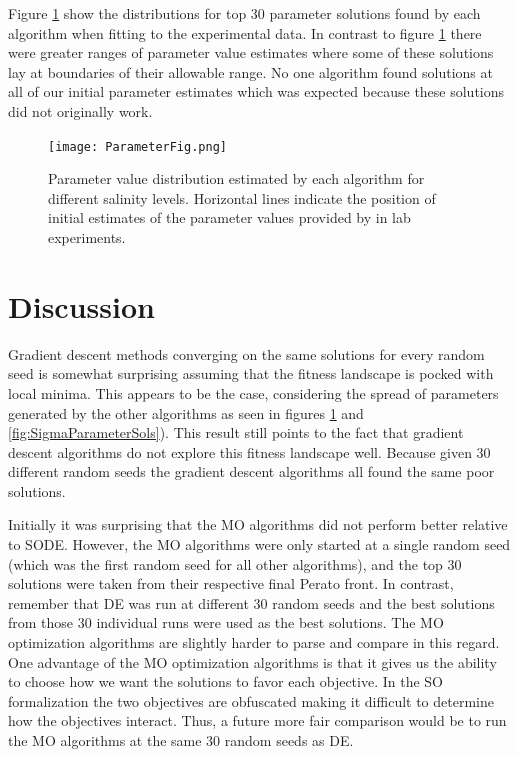 \documentclass[twocolumn, 9pt]{article}
\begin{document}
Figure \ref{fig:ParameterSols} show the distributions for top 30 parameter solutions found by each algorithm when fitting to the experimental data. In contrast to figure \ref{fig:ParameterSols} there were greater ranges of parameter value estimates where some of these solutions lay at boundaries of their allowable range. No one algorithm found solutions at all of our initial parameter estimates which was expected because these solutions did not originally work. 

\begin{figure}[t]
    \centering
    \texttt{[image: ParameterFig.png]}
    \caption{Parameter value distribution estimated by each algorithm for different salinity levels. Horizontal lines indicate the position of initial estimates of the parameter values provided by in lab experiments.}
    \label{fig:ParameterSols}
\end{figure}

\section{Discussion}
\indent{} Gradient descent methods converging on the same solutions for every random seed is somewhat surprising assuming that the fitness landscape is pocked with local minima. This appears to be the case, considering the spread of parameters generated by the other algorithms as seen in figures \ref{fig:ParameterSols} and \ref{fig:SigmaParameterSols}). This result still points to the fact that gradient descent algorithms do not explore this fitness landscape well. Because given 30 different random seeds the gradient descent algorithms all found the same poor solutions.

\indent{} Initially it was surprising that the MO algorithms did not perform better relative to SODE. However, the MO algorithms were only started at a single random seed (which was the first random seed for all other algorithms), and the top 30 solutions were taken from their respective final Perato front. In contrast, remember that DE was run at different 30 random seeds and the best solutions from those 30 individual runs were used as the best solutions. The MO optimization algorithms are slightly harder to parse and compare in this regard. One advantage of the MO optimization algorithms is that it gives us the ability to choose how we want the solutions to favor each objective. In the SO formalization the two objectives are obfuscated making it difficult to determine how the objectives interact. Thus, a future more fair comparison would be to run the MO algorithms at the same 30 random seeds as DE.
\end{document}
